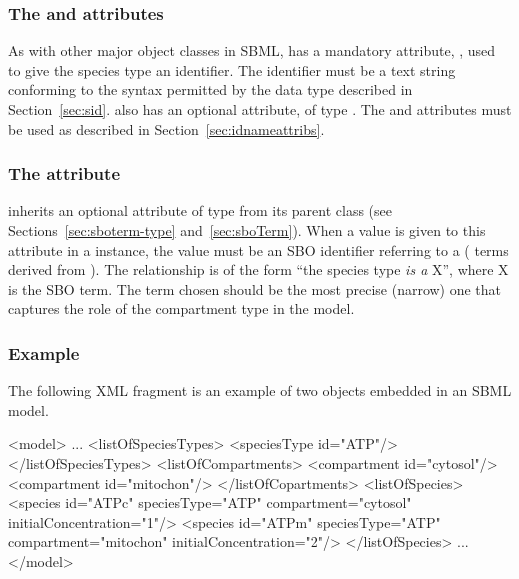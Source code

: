 
\subsubsection{The  and  attributes}

As with other major object classes in SBML, \SpeciesType has a
mandatory attribute, , used to give the species type an
identifier.  The identifier must be a text string conforming to
the syntax permitted by the  data type described in
Section~\ref{sec:sid}.  \SpeciesType also has an optional
 attribute, of type .  The 
and  attributes must be used as described in
Section~\ref{sec:idnameattribs}.


\subsubsection{The  attribute}
\label{sec:speciestype-sboterm}

\SpeciesType inherits an optional 
attribute of type  from its parent
class \SBase (see Sections~\ref{sec:sboterm-type}
and~\ref{sec:sboTerm}).  When a value is given to this
attribute in a \SpeciesType instance, the value must
be an SBO identifier referring to a  (\ie
terms derived from \sbomaterialentity).  The relationship is
of the form ``the species type \emph{is a} X'', where X is the
SBO term.  The term chosen should be the most precise (narrow) one
that captures the role of the compartment type in the model.


\subsubsection{Example}

The following XML fragment is an example of two
\SpeciesType objects embedded in an SBML model.

\begin{example}
<model>
    ...
     <listOfSpeciesTypes>
         <speciesType id="ATP"/>
     </listOfSpeciesTypes>
     <listOfCompartments>
         <compartment id="cytosol"/>
         <compartment id="mitochon"/>
     </listOfCopartments>
     <listOfSpecies>
         <species id="ATPc" speciesType="ATP" compartment="cytosol"  initialConcentration="1"/>
         <species id="ATPm" speciesType="ATP" compartment="mitochon" initialConcentration="2"/>
     </listOfSpecies>
    ...
</model>
\end{example}


